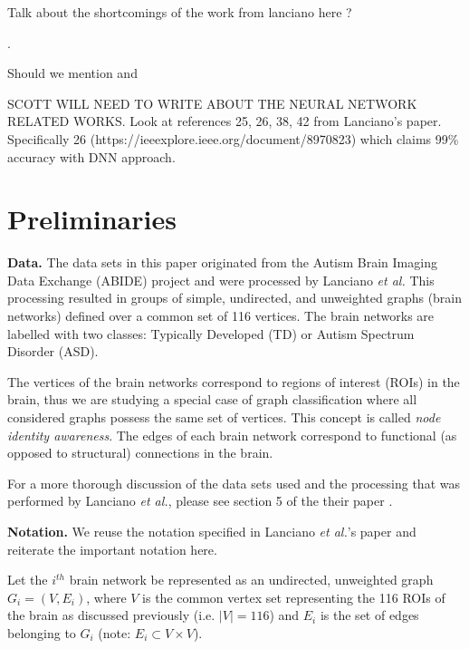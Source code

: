 \documentclass[letterpaper]{article}
\begin{document}
Talk about the shortcomings of the work from lanciano here \cite{lanciano2020}?

\cite{gutierrez2019}
\cite{tsourakakis2013}

\cite{thomas2020}
\cite{sewani2020}.

Should we mention \cite{perotti2022} and \cite{coupette2022}

SCOTT WILL NEED TO WRITE ABOUT THE NEURAL NETWORK RELATED WORKS. Look at references 25, 26, 38, 42 from Lanciano's paper. Specifically 26 (https://ieeexplore.ieee.org/document/8970823) which claims 99\% accuracy with DNN approach.

\section{Preliminaries}
\textbf{Data.}
The data sets in this paper originated from the Autism Brain Imaging Data Exchange (ABIDE) project \cite{craddock2013} and were processed by Lanciano \emph{et al.}
This processing resulted in groups of simple, undirected, and unweighted graphs (brain networks) defined over a common set of 116 vertices.
The brain networks are labelled with two classes: Typically Developed (TD) or Autism Spectrum Disorder (ASD).

The vertices of the brain networks correspond to regions of interest (ROIs) in the brain, thus we are studying a special case of graph classification where all considered graphs possess the same set of vertices.
This concept is called \emph{node identity awareness}.
The edges of each brain network correspond to functional (as opposed to structural) connections in the brain.

For a more thorough discussion of the data sets used and the processing that was performed by Lanciano \emph{et al.}, please see section 5 of the their paper \cite{lanciano2020}.

\textbf{Notation.}
We reuse the notation specified in Lanciano \emph{et al.}'s paper and reiterate the important notation here.

Let the $i^{th}$ brain network be represented as an undirected, unweighted graph $G_i = (V, E_i)$, where $V$ is the common vertex set representing the 116 ROIs of the brain as discussed previously (i.e. $|V| = 116$) and $E_i$ is the set of edges belonging to $G_i$ (note: $E_i \subset V \times V$).
\end{document}
